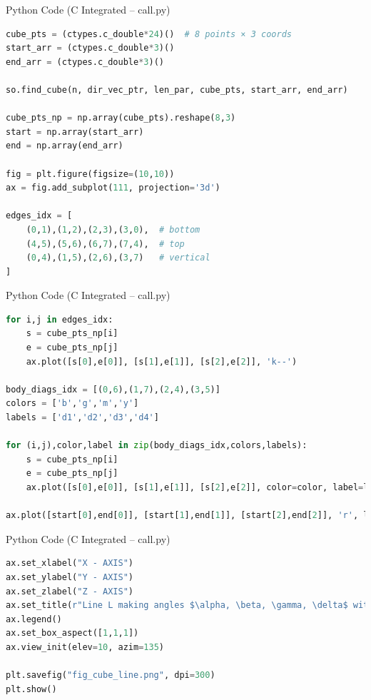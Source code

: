 \documentclass{beamer}
\begin{document}
\begin{frame}[fragile]{Python Code (C Integrated – call.py)
}
\begin{lstlisting}[language=Python]
cube_pts = (ctypes.c_double*24)()  # 8 points × 3 coords
start_arr = (ctypes.c_double*3)()
end_arr = (ctypes.c_double*3)()

so.find_cube(n, dir_vec_ptr, len_par, cube_pts, start_arr, end_arr)

cube_pts_np = np.array(cube_pts).reshape(8,3)
start = np.array(start_arr)
end = np.array(end_arr)

fig = plt.figure(figsize=(10,10))
ax = fig.add_subplot(111, projection='3d')

edges_idx = [
    (0,1),(1,2),(2,3),(3,0),  # bottom
    (4,5),(5,6),(6,7),(7,4),  # top
    (0,4),(1,5),(2,6),(3,7)   # vertical
]
\end{lstlisting}
\end{frame}

\begin{frame}[fragile]{Python Code (C Integrated – call.py)
}
\begin{lstlisting}[language=Python]
for i,j in edges_idx:
    s = cube_pts_np[i]
    e = cube_pts_np[j]
    ax.plot([s[0],e[0]], [s[1],e[1]], [s[2],e[2]], 'k--')

body_diags_idx = [(0,6),(1,7),(2,4),(3,5)]
colors = ['b','g','m','y']
labels = ['d1','d2','d3','d4']

for (i,j),color,label in zip(body_diags_idx,colors,labels):
    s = cube_pts_np[i]
    e = cube_pts_np[j]
    ax.plot([s[0],e[0]], [s[1],e[1]], [s[2],e[2]], color=color, label=label)

ax.plot([start[0],end[0]], [start[1],end[1]], [start[2],end[2]], 'r', label='Line L')
\end{lstlisting}
\end{frame}

\begin{frame}[fragile]{Python Code (C Integrated – call.py)
}
\begin{lstlisting}[language=Python]
ax.set_xlabel("X - AXIS")
ax.set_ylabel("Y - AXIS")
ax.set_zlabel("Z - AXIS")
ax.set_title(r"Line L making angles $\alpha, \beta, \gamma, \delta$ with the body diagonals of a cube")
ax.legend()
ax.set_box_aspect([1,1,1])
ax.view_init(elev=10, azim=135)

plt.savefig("fig_cube_line.png", dpi=300)
plt.show()
\end{lstlisting}
\end{frame}
\end{document}
